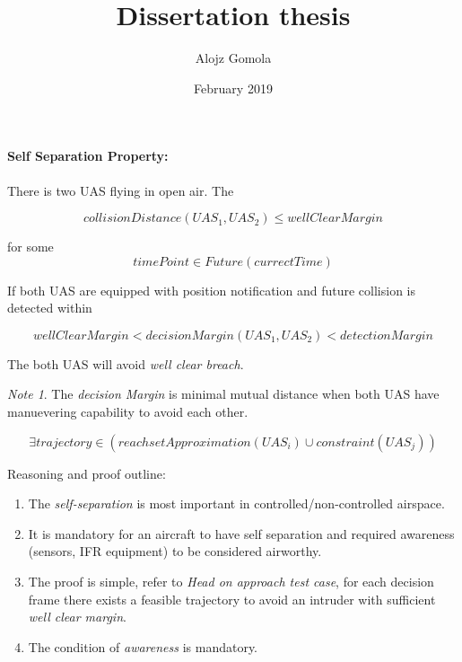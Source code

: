 \documentclass[12pt, a4paper]{report}
\title{Dissertation thesis}
\author{Alojz Gomola}
\date{February 2019}
\theoremstyle{plain}
\theoremstyle{plain}
\theoremstyle{remark}
\newtheorem*{note}{Note}
\begin{document}
\paragraph{Self Separation Property:} There is two UAS flying in open air. The 

\begin{equation*}
    collision Distance (UAS_1,UAS_2) \le well Clear Margin
\end{equation*} 

for some 
\begin{equation*}
    time Point \in Future(currect Time)    
\end{equation*}


If both UAS are equipped with position notification and future collision is detected within 

\begin{equation*}
    well Clear Margin < decision Margin(UAS_1,UAS_2) < detection Margin    
\end{equation*}

The both UAS will avoid \emph{well clear breach}.
\begin{note}
    The \emph{decision Margin} is minimal mutual distance when both UAS have manuevering capability to avoid each other.
    
    \begin{equation*}
        \exists trajectory \in \left(reach set Approximation(UAS_i) \cup constraint(UAS_j) \right)
    \end{equation*}
\end{note}

\noindent Reasoning and proof outline:
\begin{enumerate}
    \item The \emph{self-separation} is most important in controlled/non-controlled airspace.
    
    \item It is mandatory for an aircraft to have self separation and required awareness (sensors, IFR equipment) to be considered airworthy.
    
    \item The proof is simple, refer to \emph{Head on approach test case}, for each decision frame there exists a feasible trajectory to avoid an intruder with sufficient \emph{well clear margin}.
    
    \item The condition of \emph{awareness} is mandatory.
\end{enumerate}
\end{document}
